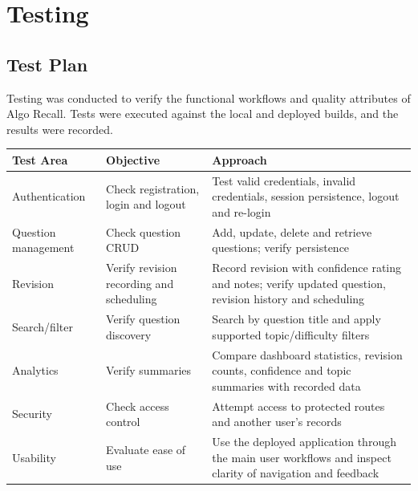 \documentclass[12pt,a4paper]{report}
\begin{document}
\chapter{Testing}
\section{Test Plan}
Testing was conducted to verify the functional workflows and quality attributes of Algo Recall. Tests were executed against the local and deployed builds, and the results were recorded.

\begin{longtable}{|p{}|p{}|p{}|}
\hline
\textbf{Test Area} & \textbf{Objective} & \textbf{Approach}\\\hline
Authentication & Check registration, login and logout & Test valid credentials, invalid credentials, session persistence, logout and re-login\\\hline
Question management & Check question CRUD & Add, update, delete and retrieve questions; verify persistence\\\hline
Revision & Verify revision recording and scheduling & Record revision with confidence rating and notes; verify updated question, revision history and scheduling\\\hline
Search/filter & Verify question discovery & Search by question title and apply supported topic/difficulty filters\\\hline
Analytics & Verify summaries & Compare dashboard statistics, revision counts, confidence and topic summaries with recorded data\\\hline
Security & Check access control & Attempt access to protected routes and another user's records\\\hline
Usability & Evaluate ease of use & Use the deployed application through the main user workflows and inspect clarity of navigation and feedback\\\hline
\end{longtable}
\end{document}
